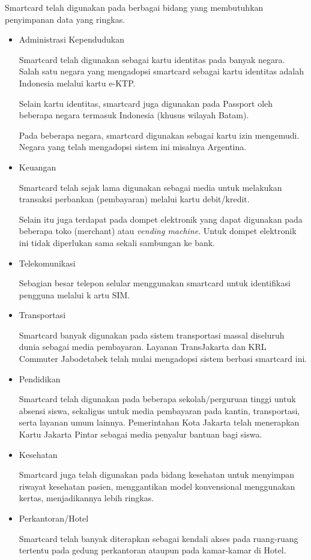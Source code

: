 \documentclass[a4paper, 12pt]{report}
\begin{document}
Smartcard telah digunakan pada berbagai bidang yang membutuhkan penyimpanan data yang ringkas.

\begin{itemize}

\item Administrasi Kependudukan

Smartcard telah digunakan sebagai kartu identitas pada banyak negara. Salah satu negara yang mengadopsi smartcard sebagai kartu identitas adalah Indonesia melalui kartu e-KTP. 

Selain kartu identitas, smartcard juga digunakan pada Passport oleh beberapa negara termasuk Indonesia (khusus wilayah Batam).

Pada beberapa negara, smartcard digunakan sebagai kartu izin mengemudi. Negara yang telah mengadopsi sistem ini misalnya Argentina.

\item Keuangan

Smartcard telah sejak lama digunakan sebagai media untuk melakukan transaksi perbankan (pembayaran) melalui kartu debit/kredit. 

Selain itu juga terdapat pada dompet elektronik yang dapat digunakan pada beberapa toko (merchant) atau \emph{vending machine}. Untuk dompet elektronik ini tidak diperlukan sama sekali sambungan ke bank. 

\item Telekomunikasi

Sebagian besar telepon selular menggunakan smartcard untuk identifikasi pengguna melalui k
artu SIM.

\item Transportasi

Smartcard banyak digunakan pada sistem transportasi massal diseluruh dunia sebagai media pembayaran. Layanan TransJakarta dan KRL Commuter Jabodetabek telah mulai mengadopsi sistem berbasi smartcard ini.

\item Pendidikan

Smartcard telah digunakan pada beberapa sekolah/perguruan tinggi untuk absensi siswa, sekaligus untuk media pembayaran pada kantin, transportasi, serta layanan umum lainnya. Pemerintahan Kota Jakarta telah menerapkan Kartu Jakarta Pintar sebagai media penyalur bantuan bagi siswa.

\item Kesehatan

Smartcard juga telah digunakan pada bidang kesehatan untuk menyimpan riwayat kesehatan pasien, menggantikan model konvensional menggunakan kertas, menjadikannya lebih ringkas.

\item Perkantoran/Hotel

Smartcard telah banyak diterapkan sebagai kendali akses pada ruang-ruang tertentu pada gedung perkantoran ataupun pada kamar-kamar di Hotel.

\end{itemize}
\end{document}
